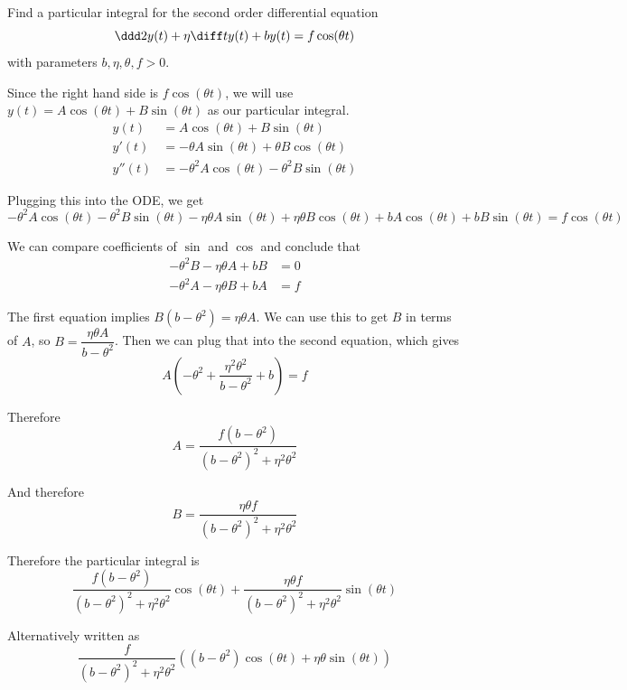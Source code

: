 \documentclass[a4paper]{article}
\begin{document}

\begin{questionbody}
Find a particular integral for the second order differential equation \[
\ddd 2{} y(t) + \eta \diff t y(t) + b y(t) = f \cos (\theta t)
\] with parameters $b, \eta, \theta, f > 0$.
\end{questionbody}

Since the right hand side is $f \cos(\theta t)$, we will use $y(t) = A \cos(\theta t) + B \sin(\theta t)$ as our particular integral.
\begin{align*}
	y(t)   &= A \cos(\theta t) + B \sin(\theta t)\\
	y'(t)  &= -\theta A \sin(\theta t) + \theta B \cos(\theta t)\\
	y''(t) &= -\theta^2 A \cos(\theta t) - \theta^2 B \sin(\theta t)
\end{align*}

Plugging this into the ODE, we get $$-\theta^2 A \cos(\theta t) - \theta^2 B \sin(\theta t) -\eta\theta A \sin(\theta t) + \eta\theta B \cos(\theta t) + bA \cos(\theta t) + bB \sin(\theta t) = f \cos(\theta t)$$

We can compare coefficients of $\sin$ and $\cos$ and conclude that \begin{align*}
	-\theta^2 B - \eta\theta A + bB &= 0\\
	-\theta^2 A - \eta\theta B + bA &= f
\end{align*}

The first equation implies $B(b - \theta^2) = \eta\theta A$. We can use this to get $B$ in terms of $A$, so $B = \dfrac{\eta\theta A}{b - \theta^2}$. Then we can plug that into the second equation, which gives $$A \left(-\theta^2 + \frac{\eta^2 \theta^2}{b - \theta^2} + b\right) = f$$

Therefore $$A = \frac{f (b - \theta^2)}{(b - \theta^2)^2 + \eta^2 \theta^2}$$

And therefore $$B = \frac{\eta \theta f}{(b - \theta^2)^2 + \eta^2 \theta^2}$$

Therefore the particular integral is $$\frac{f (b - \theta^2)}{(b - \theta^2)^2 + \eta^2 \theta^2} \cos(\theta t) + \frac{\eta \theta f}{(b - \theta^2)^2 + \eta^2 \theta^2} \sin (\theta t)$$

Alternatively written as $$\frac{f}{(b - \theta^2)^2 + \eta^2 \theta^2} \left( (b - \theta^2) \cos(\theta t) + \eta \theta \sin(\theta t) \right)$$
\end{document}
